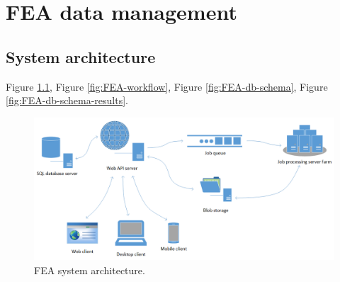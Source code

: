 \chapter{FEA data management}
\label{chapter:data-management}


\section{System architecture}
\label{sec:system-architecture}




Figure \ref{fig:FEA-architecture}, Figure \ref{fig:FEA-workflow}, Figure \ref{fig:FEA-db-schema}, Figure \ref{fig:FEA-db-schema-results}.

\begin{figure}[H]
    \centering
    \includegraphics[width=\textwidth]{figures/FEA-architecture}
    \decoRule
    \caption{FEA system architecture.}
    \label{fig:FEA-architecture}
\end{figure}

